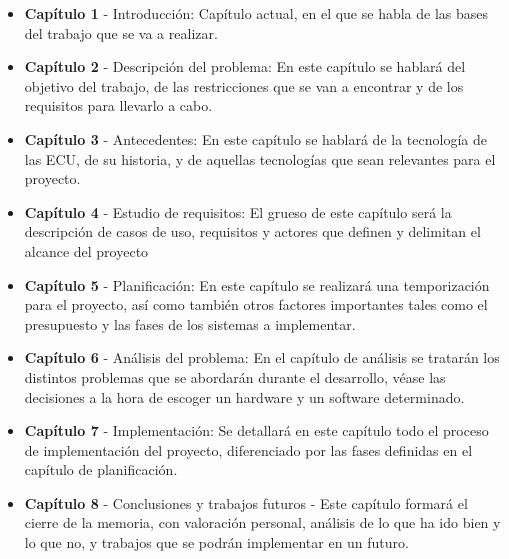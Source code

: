 \begin{itemize}
    \item \textbf{Capítulo 1} - Introducción: Capítulo actual, en el que se habla de las bases del trabajo que se va a realizar.
    \item \textbf{Capítulo 2} - Descripción del problema: En este capítulo se hablará del objetivo del trabajo, de las restricciones que se van a encontrar y de los requisitos para llevarlo a cabo.
    \item \textbf{Capítulo 3} - Antecedentes: En este capítulo se hablará de la tecnología de las ECU, de su historia, y de aquellas tecnologías que sean relevantes para el proyecto. 
    \item \textbf{Capítulo 4} - Estudio de requisitos: El grueso de este capítulo será la descripción de casos de uso, requisitos y actores que definen y delimitan el alcance del proyecto 
    \item \textbf{Capítulo 5} - Planificación: En este capítulo se realizará una temporización para el proyecto, así como también otros factores importantes tales como el presupuesto y las fases de los sistemas a implementar. 
    \item \textbf{Capítulo 6} - Análisis del problema: En el capítulo de análisis se tratarán los distintos problemas que se abordarán durante el desarrollo, véase las decisiones a la hora de escoger un hardware y un software determinado.
    \item \textbf{Capítulo 7} - Implementación: Se detallará en este capítulo todo el proceso de implementación del proyecto, diferenciado por las fases definidas en el capítulo de planificación. 
    \item \textbf{Capítulo 8} - Conclusiones y trabajos futuros - Este capítulo formará el cierre de la memoria, con valoración personal, análisis de lo que ha ido bien y lo que no, y trabajos que se podrán implementar en un futuro. 
\end{itemize}
